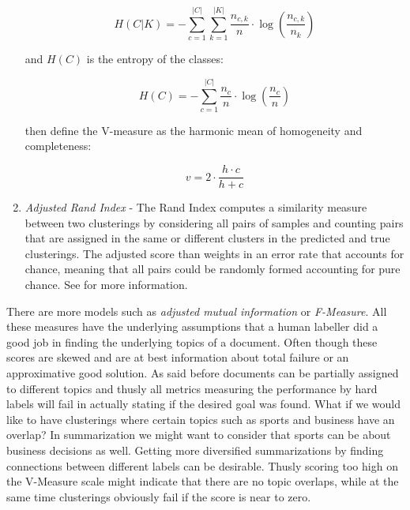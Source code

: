 \begin{enumerate}
          \begin{equation}
            H(C|K) = - \sum_{c=1}^{|C|} \sum_{k=1}^{|K|} \frac{n_{c,k}}{n}\cdot \log\left(\frac{n_{c,k}}{n_k}\right)
          \end{equation}

        and $H(C)$ is the entropy of the classes:

          \begin{equation}
            H(C) = - \sum_{c=1}^{|C|} \frac{n_c}{n} \cdot \log\left(\frac{n_c}{n}\right)
          \end{equation}

        \cite{VMeasure2007} then define the V-measure as the harmonic mean of homogeneity and completeness:

          \begin{equation}
            v = 2 \cdot \frac{h \cdot c}{h + c}
          \end{equation}

        \item \emph{Adjusted Rand Index} - The Rand Index computes a similarity measure between two clusterings by considering all pairs of samples and counting pairs that are assigned in the same or different clusters in the predicted and true clusterings. The adjusted score than weights in an error rate that accounts for chance, meaning that all pairs could be randomly formed accounting for pure chance. See \cite{RandIndex1971} for more information.
      \end{enumerate}

    There are more models such as \emph{adjusted mutual information} or \emph{F-Measure}. All these measures have the underlying assumptions that a human labeller did a good job in finding the underlying topics of a document. Often though these scores are skewed and are at best information about total failure or an approximative good solution. As said before documents can be partially assigned to different topics and thusly all metrics measuring the performance by hard labels will fail in actually stating if the desired goal was found. What if we would like to have clusterings where certain topics such as sports and business have an overlap? In summarization we might want to consider that sports can be about business decisions as well. Getting more diversified summarizations by finding connections between different labels can be desirable. Thusly scoring too high on the V-Measure scale might indicate that there are no topic overlaps, while at the same time clusterings obviously fail if the score is near to zero.

